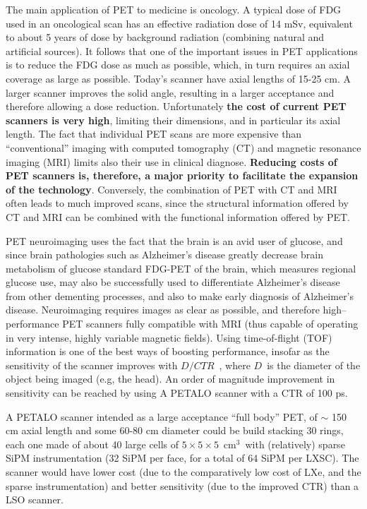 \documentclass[review]{elsarticle}
\begin{document}
The main application of PET to medicine is oncology. A typical dose of FDG used in an oncological scan has an effective radiation dose of 14 mSv, equivalent to about 5 years of dose by background radiation (combining natural and artificial sources). It follows that one of the important issues in PET applications is to reduce the FDG dose as much as possible, which, in turn requires an axial coverage as large as possible. Today's scanner have axial lengths of 15-25 cm. A larger scanner improves the solid angle, resulting in a larger acceptance and therefore allowing a dose reduction. Unfortunately {\bf the cost of current PET scanners is very high}, limiting their dimensions, and in particular its axial length. The fact that  individual PET scans are more expensive than ``conventional'' imaging with computed tomography (CT) and magnetic resonance imaging (MRI) limits also their use in clinical diagnose. {\bf Reducing costs of PET scanners is, therefore, a major priority to facilitate the expansion of the technology}. Conversely, the combination of PET with CT and MRI often leads to much improved scans, since the structural information offered by CT and MRI can be combined with the functional information offered by PET. 

PET neuroimaging uses the fact that the brain is an avid user of glucose, and since brain pathologies such as Alzheimer's disease greatly decrease brain metabolism of glucose standard FDG-PET of the brain, which measures regional glucose use, may also be successfully used to differentiate Alzheimer's disease from other dementing processes, and also to make early diagnosis of Alzheimer's disease. Neuroimaging requires images as clear as possible, and therefore high--performance PET scanners fully compatible with MRI (thus capable of operating in very intense, highly variable magnetic fields). Using time-of-flight (TOF) information is one of the best ways of boosting performance, insofar as the sensitivity of the scanner improves with $D/CTR$~, where $D$~is the diameter of the object being imaged (e.g, the head). An order of magnitude improvement in sensitivity can be reached by using
A PETALO scanner with a CTR of 100 ps. 

A PETALO scanner intended as a large acceptance ``full body'' PET, of $\sim$ 150 cm axial length and some 60-80 cm diameter could be build stacking 30 rings, each one made of about 40 large cells of $5 \times 5 \times 5$~cm$^3$~with (relatively) sparse SiPM instrumentation (32 SiPM per face, for a total of 64 SiPM per LXSC). The scanner would have lower cost (due to the comparatively low cost of LXe, and the sparse instrumentation) and better sensitivity (due to the  improved CTR) than a LSO scanner.  
\end{document}
